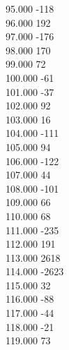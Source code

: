 { 95.000	-118 \\
 96.000	192 \\
 97.000	-176 \\
 98.000	170 \\
 99.000	72 \\
 100.000	-61 \\
 101.000	-37 \\
 102.000	92 \\
 103.000	16 \\
 104.000	-111 \\
 105.000	94 \\
 106.000	-122 \\
 107.000	44 \\
 108.000	-101 \\
 109.000	66 \\
 110.000	68 \\
 111.000	-235 \\
 112.000	191 \\
 113.000	2618 \\
 114.000	-2623 \\
 115.000	32 \\
 116.000	-88 \\
 117.000	-44 \\
 118.000	-21 \\
 119.000	73 \\
}
